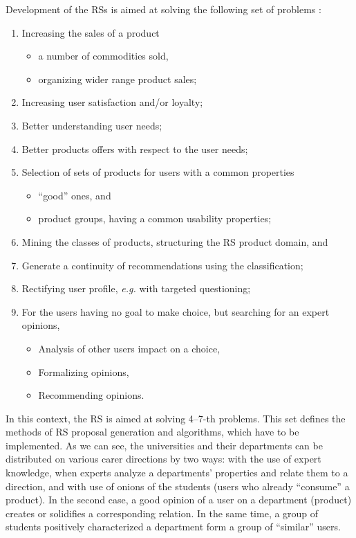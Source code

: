 \documentclass[conference,a4]{IEEEtran}
\begin{document}
Development of the RSs is aimed at solving the following set of problems \cite{ricci}:
\begin{enumerate}
\item Increasing the sales of a product
  \begin{itemize}
  \item a number of commodities sold,
  \item organizing wider range product sales;
  \end{itemize}
\item Increasing user satisfaction and/or loyalty;
\item Better understanding user needs;
\item Better products offers with respect to the user needs;
\item Selection of sets of products for users with a common properties
  \begin{itemize}
  \item ``good'' ones, and
  \item product groups, having a common usability properties;
  \end{itemize}
\item Mining the classes of products, structuring the RS product domain, and
\item Generate a continuity of recommendations using the classification;
\item Rectifying user profile, \emph{e.g.} with targeted questioning;
\item For the users having no goal to make choice, but searching for an expert opinions,
  \begin{itemize}
  \item Analysis of other users impact on a choice,
  \item Formalizing opinions,
  \item Recommending opinions.
  \end{itemize}
\end{enumerate}
In this context, the RS is aimed at solving 4--7-th problems.  This set defines the methods of RS proposal generation and algorithms, which have to be implemented.  As we can see, the universities and their departments can be distributed on various carer directions by two ways: with the use of expert knowledge, when experts analyze a departments' properties and relate them to a direction, and with use of onions of the students (users who already ``consume'' a product).  In the second case, a good opinion of a user on a department (product) creates or solidifies a corresponding relation.  In the same time, a group of students positively characterized a department form a group of ``similar'' users.  %
\end{document}
